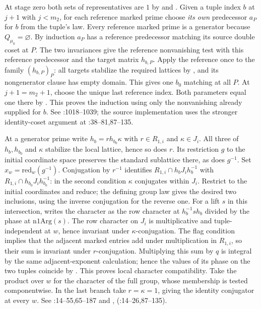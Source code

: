 At stage zero both sets of representatives are $1$ by
 and . Given a tuple index $b$ at
$j+1$ with $j<m_2$, for each reference marked prime choose
\emph{its own} predecessor $a_P$ for $b$ from the tuple's
 law. Every reference marked prime is a generator
because $Q_{\mu_0}=\varnothing$. By induction $a_P$ has a reference
predecessor matching its source double coset at $P$. The two
invariances give the reference nonvanishing test with this reference
predecessor and the target matrix $h_{b,P}$. Apply the reference
 once to the family $(h_{b,P})_P$: all targets stabilize
the required lattices by , and its nongenerator clause
has empty domain. This gives one $b_0$ matching at all $P$.
At $j+1=m_2+1$, choose the unique last reference index. Both
parameters equal one there by . This proves the
induction using only the nonvanishing already supplied for $b$.
See :1018--1039; the source
implementation uses the stronger identity-coset argument at
:38--81,87--135.

At a generator prime write $h_b=r h_{b_0}\kappa$ with
$r\in R_{1,i}$ and $\kappa\in J_i$. All three of $h_b,h_{b_0}$
and $\kappa$ stabilize the local lattice, hence so does $r$.
Its restriction $g$ to the initial coordinate space preserves the
standard sublattice there, as does $g^{-1}$. Set
$x_w=\mathrm{red}_w(g^{-1})$. Conjugation by $r^{-1}$ identifies
$R_{1,i}\cap h_bJ_i h_b^{-1}$ with
$R_{1,i}\cap h_{b_0}J_i h_{b_0}^{-1}$: in the second condition
$\kappa$ conjugates within $J_i$. Restrict to the initial coordinates
and reduce; the defining group law  gives the desired
two inclusions, using the inverse conjugation for the reverse one.
For a lift $s$ in this intersection,  writes the
character as the row character at $h_b^{-1}s h_b$ divided by the
phase at $\mathrm{n1Arg}(s)$. The row character on $J_i$ is
multiplicative and tuple-independent at $w$, hence invariant under
$\kappa$-conjugation. The flag condition implies that the adjacent
marked entries add under multiplication in $R_{1,i}$, so their
sum is invariant under $r$-conjugation. Multiplying this sum by
$q$ is integral by the same adjacent-exponent calculation; hence
the values of its phase on the two tuples coincide by .
This proves local character compatibility. Take the product over
$w$ for the character of the full group, whose membership is tested
componentwise. In the last branch take $r=\kappa=1$, giving the
identity conjugator at every $w$. See
:14--55,65--187 and
, 
(:14--26,87--135).

